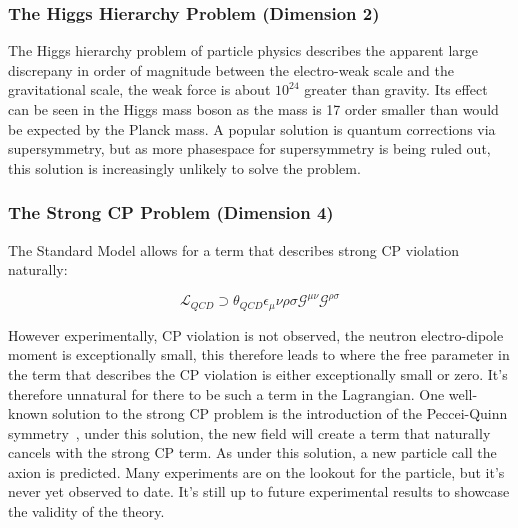 



\subsubsection{The Higgs Hierarchy Problem (Dimension 2)}
The Higgs hierarchy problem of particle physics describes the apparent large discrepany in order of magnitude between the electro-weak scale and the gravitational scale, the weak force is about $10^{24}$ greater than gravity. Its effect can be seen in the Higgs mass boson as the mass is 17 order smaller than would be expected by the Planck mass. 
A popular solution is quantum corrections via supersymmetry, but as more phasespace for supersymmetry is being ruled out, this solution is increasingly unlikely to solve the problem. 

\subsubsection{The Strong CP Problem (Dimension 4)}
The Standard Model allows for a term that describes strong CP violation naturally:

\begin{equation}
    \mathcal{L}_{QCD} \supset \theta_{QCD}\epsilon_\mu\nu\rho\sigma \mathcal{G}^{\mu\nu}\mathcal{G}^{\rho\sigma}
\end{equation}

However experimentally, CP violation is not observed, the neutron electro-dipole moment is exceptionally small, this therefore leads to where the free parameter in the term that describes the CP violation is either exceptionally small or zero. It's therefore unnatural for there to be such a term in the Lagrangian.
One well-known solution to the strong CP problem is the introduction of the Peccei-Quinn symmetry~\cite{PQSym}, under this solution, the new field will create a term that naturally cancels with the strong CP term. As under this solution, a new particle call the axion is predicted. Many experiments are on the lookout for the particle, but it's never yet observed to date. It's still up to future experimental results to showcase the validity of the theory.

